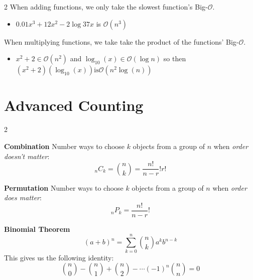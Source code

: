 \documentclass{exam}
\begin{document}
\begin{multicols}{2}
            When adding functions, we only take the slowest function's Big-$\mathcal{O}$.
            \begin{itemize}
                \item[\textbf{ex.}] $0.01x^3+12x^{2}-2\log{37x}$ is $\mathcal{O}(n^{3})$
            \end{itemize}
            
            When multiplying functions, we take take the product of the functions' Big-$\mathcal{O}$. 
            \begin{itemize}
                \item[\textbf{ex.}] $x^{2}+2\in \mathcal{O}(n^{2})$ and $\log_{10}(x)\in \mathcal{O}(\log{n})$ so then \\
                $(x^{2}+2)(\log_{10}(x)) \text{is} \mathcal{O}(n^{2} \log(n))$
            \end{itemize}
    \end{multicols}

\section*{Advanced Counting}
\begin{multicols}{2}
    \begin{myThm}
        \textbf{Combination} Number ways to choose $k$ objects from a group of $n$ when \textit{order doesn't matter}:
        $${}_{n}C_{k}=\binom{n}{k}=\frac{n!}{n-r}!r!$$
    \end{myThm}
    
    \begin{myThm}
        \textbf{Permutation} Number ways to choose $k$ objects from a group of $n$ when \textit{order does matter}:
        $${}_{n}P_{k}=\frac{n!}{n-r}!$$
    \end{myThm}
\end{multicols}

\begin{myThm}
    \textbf{Binomial Theorem} 
    $$(a+b)^{n}=\sum^{n}_{k=0} \binom{n}{k} a^{k}b^{n-k}$$
    This gives us the following identity:
    $$\binom{n}{0}-\binom{n}{1}+\binom{n}{2}-\cdots (-1)^{n}\binom{n}{n}=0$$
\end{myThm}
\vspace{10pt}
\end{document}
